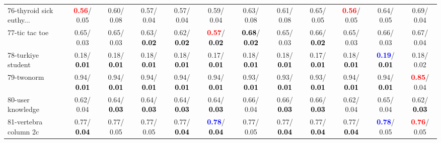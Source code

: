 \begin{table}[h]
\begin{center}
{\begin{tabular}{lc|c|c|c|c|c|c|c|c|c|c}
76-thyroid sick euthy... & \textcolor{red}{\textbf{  0.56}}/  0.05 &   0.60/  0.08 &   0.57/  0.04 &   0.57/  0.04 &   0.59/  0.04 &   0.63/  0.08 &   0.61/  0.08 &   0.65/  0.05 & \textcolor{red}{\textbf{  0.56}}/  0.05 &   0.64/  0.05 &   0.69/  0.04 \\
77-tic tac toe &   0.65/  0.03 &   0.65/  0.03 &   0.63/\textcolor{black}{\textbf{  0.02}} &   0.62/\textcolor{black}{\textbf{  0.02}} & \textcolor{red}{\textbf{  0.57}}/\textcolor{black}{\textbf{  0.02}} & \textcolor{black}{\textbf{  0.68}}/\textcolor{black}{\textbf{  0.02}} &   0.65/  0.03 &   0.66/\textcolor{black}{\textbf{  0.02}} &   0.65/  0.03 &   0.66/  0.03 &   0.67/  0.04 \\
78-turkiye student &   0.18/\textcolor{black}{\textbf{  0.01}} &   0.18/\textcolor{black}{\textbf{  0.01}} &   0.18/\textcolor{black}{\textbf{  0.01}} &   0.18/\textcolor{black}{\textbf{  0.01}} &   0.17/\textcolor{black}{\textbf{  0.01}} &   0.18/\textcolor{black}{\textbf{  0.01}} &   0.18/\textcolor{black}{\textbf{  0.01}} &   0.17/\textcolor{black}{\textbf{  0.01}} &   0.18/\textcolor{black}{\textbf{  0.01}} & \textcolor{blue}{\textbf{  0.19}}/\textcolor{black}{\textbf{  0.01}} &   0.18/  0.02 \\ \hline
79-twonorm &   0.94/\textcolor{black}{\textbf{  0.01}} &   0.94/\textcolor{black}{\textbf{  0.01}} &   0.94/\textcolor{black}{\textbf{  0.01}} &   0.94/\textcolor{black}{\textbf{  0.01}} &   0.94/\textcolor{black}{\textbf{  0.01}} &   0.93/\textcolor{black}{\textbf{  0.01}} &   0.93/\textcolor{black}{\textbf{  0.01}} &   0.93/\textcolor{black}{\textbf{  0.01}} &   0.94/\textcolor{black}{\textbf{  0.01}} &   0.94/\textcolor{black}{\textbf{  0.01}} & \textcolor{red}{\textbf{  0.85}}/  0.04 \\
80-user knowledge &   0.62/  0.04 &   0.64/\textcolor{black}{\textbf{  0.03}} &   0.64/\textcolor{black}{\textbf{  0.03}} &   0.64/\textcolor{black}{\textbf{  0.03}} &   0.64/\textcolor{black}{\textbf{  0.03}} &   0.66/  0.04 &   0.66/\textcolor{black}{\textbf{  0.03}} &   0.66/\textcolor{black}{\textbf{  0.03}} &   0.62/  0.04 &   0.65/  0.04 &   0.62/\textcolor{black}{\textbf{  0.03}} \\
81-vertebra column 2c &   0.77/\textcolor{black}{\textbf{  0.04}} &   0.77/  0.05 &   0.77/  0.05 &   0.77/\textcolor{black}{\textbf{  0.04}} & \textcolor{blue}{\textbf{  0.78}}/\textcolor{black}{\textbf{  0.04}} &   0.77/  0.05 &   0.77/\textcolor{black}{\textbf{  0.04}} &   0.77/\textcolor{black}{\textbf{  0.04}} &   0.77/\textcolor{black}{\textbf{  0.04}} & \textcolor{blue}{\textbf{  0.78}}/  0.05 & \textcolor{red}{\textbf{  0.76}}/  0.05 \\

\end{tabular}}
\end{center}
\end{table}
